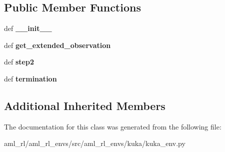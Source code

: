 \subsection*{Public Member Functions}
\begin{DoxyCompactItemize}
\item 
\hypertarget{classaml__rl__envs_1_1kuka_1_1kuka__env_1_1_kuka_env_ad2e21d343c92aace64adcc873e97b834}{def {\bfseries \-\_\-\-\_\-init\-\_\-\-\_\-}}\label{classaml__rl__envs_1_1kuka_1_1kuka__env_1_1_kuka_env_ad2e21d343c92aace64adcc873e97b834}

\item 
\hypertarget{classaml__rl__envs_1_1kuka_1_1kuka__env_1_1_kuka_env_a6f975fbfa9a7ab035887f5c218f901de}{def {\bfseries get\-\_\-extended\-\_\-observation}}\label{classaml__rl__envs_1_1kuka_1_1kuka__env_1_1_kuka_env_a6f975fbfa9a7ab035887f5c218f901de}

\item 
\hypertarget{classaml__rl__envs_1_1kuka_1_1kuka__env_1_1_kuka_env_a6332839dd1f442307300c4f5db39a82d}{def {\bfseries step2}}\label{classaml__rl__envs_1_1kuka_1_1kuka__env_1_1_kuka_env_a6332839dd1f442307300c4f5db39a82d}

\item 
\hypertarget{classaml__rl__envs_1_1kuka_1_1kuka__env_1_1_kuka_env_a3a99ab3ebfa349ebf40e71514d900377}{def {\bfseries termination}}\label{classaml__rl__envs_1_1kuka_1_1kuka__env_1_1_kuka_env_a3a99ab3ebfa349ebf40e71514d900377}

\end{DoxyCompactItemize}
\subsection*{Additional Inherited Members}


The documentation for this class was generated from the following file\-:\begin{DoxyCompactItemize}
\item 
aml\-\_\-rl/aml\-\_\-rl\-\_\-envs/src/aml\-\_\-rl\-\_\-envs/kuka/kuka\-\_\-env.\-py\end{DoxyCompactItemize}
